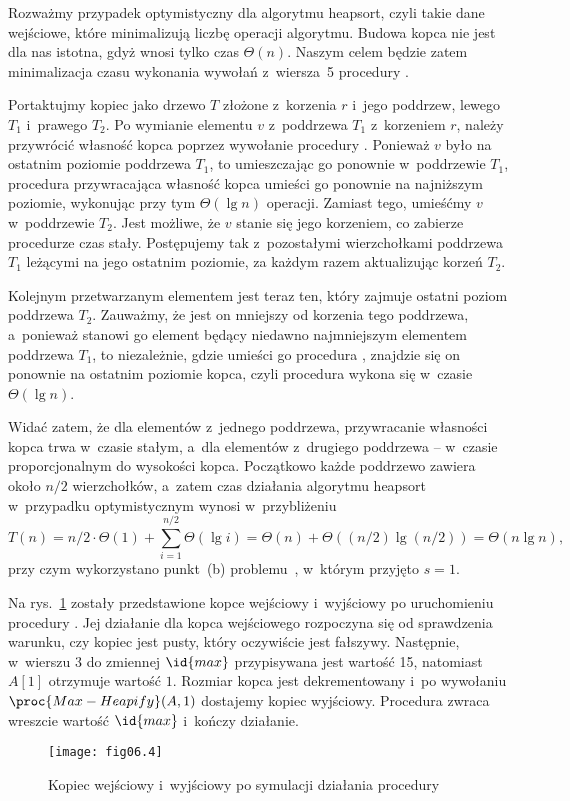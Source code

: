\exercise %
Rozważmy przypadek optymistyczny dla algorytmu heapsort, czyli takie dane wejściowe, które minimalizują liczbę operacji algorytmu. Budowa kopca nie jest dla nas istotna, gdyż wnosi tylko czas $\Theta(n)$. Naszym celem będzie zatem minimalizacja czasu wykonania wywołań  z~wiersza~5 procedury .

Portaktujmy kopiec jako drzewo $T$ złożone z~korzenia $r$ i~jego poddrzew, lewego $T_1$ i~prawego $T_2$. Po wymianie elementu $v$ z~poddrzewa $T_1$ z~korzeniem $r$, należy przywrócić własność kopca poprzez wywołanie procedury . Ponieważ $v$ było na ostatnim poziomie poddrzewa $T_1$, to umieszczając go ponownie w~poddrzewie $T_1$, procedura przywracająca własność kopca umieści go ponownie na najniższym poziomie, wykonując przy tym $\Theta(\lg n)$ operacji. Zamiast tego, umieśćmy $v$ w~poddrzewie $T_2$. Jest możliwe, że $v$ stanie się jego korzeniem, co zabierze procedurze  czas stały. Postępujemy tak z~pozostałymi wierzchołkami poddrzewa $T_1$ leżącymi na jego ostatnim poziomie, za każdym razem aktualizując korzeń $T_2$.

Kolejnym przetwarzanym elementem jest teraz ten, który zajmuje ostatni poziom poddrzewa $T_2$. Zauważmy, że jest on mniejszy od korzenia tego poddrzewa, a~ponieważ stanowi go element będący niedawno najmniejszym elementem poddrzewa $T_1$, to niezależnie, gdzie umieści go procedura , znajdzie się on ponownie na ostatnim poziomie kopca, czyli procedura wykona się w~czasie $\Theta(\lg n)$.

Widać zatem, że dla elementów z~jednego poddrzewa, przywracanie własności kopca trwa w~czasie stałym, a~dla elementów z~drugiego poddrzewa -- w~czasie proporcjonalnym do wysokości kopca. Początkowo każde poddrzewo zawiera około $n/2$ wierzchołków, a~zatem czas działania algorytmu heapsort w~przypadku optymistycznym wynosi w~przybliżeniu
\[
	T(n) = n/2\cdot\Theta(1)+\sum_{i=1}^{n/2}\Theta(\lg i) = \Theta(n)+\Theta((n/2)\lg(n/2)) = \Theta(n\lg n),
\]
przy czym wykorzystano punkt~(b) problemu~, w~którym przyjęto $s=1$.


\exercise %
Na rys.~\ref{fig:6.5-1} zostały przedstawione kopce wejściowy i~wyjściowy po uruchomieniu procedury . Jej działanie dla kopca wejściowego rozpoczyna się od sprawdzenia warunku, czy kopiec jest pusty, który oczywiście jest fałszywy. Następnie, w~wierszu 3 do zmiennej $\id{max}$ przypisywana jest wartość 15, natomiast $A[1]$ otrzymuje wartość $1$. Rozmiar kopca jest dekrementowany i~po wywołaniu $\proc{Max-Heapify}(A,1)$ dostajemy kopiec wyjściowy. Procedura zwraca wreszcie wartość $\id{max}$ i~kończy działanie.
\begin{figure}[ht]
	\begin{center}
		\texttt{[image: fig06.4]}
	\end{center}
	\caption{Kopiec wejściowy i~wyjściowy po symulacji działania procedury } \label{fig:6.5-1}
\end{figure}

